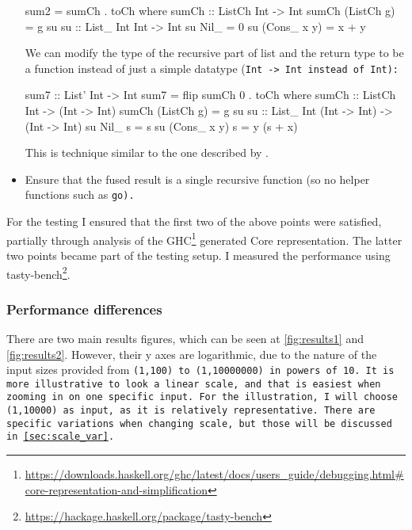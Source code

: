 \begin{itemize}[noitemsep]
\begin{spec}
sum2 = sumCh . toCh
  where sumCh :: ListCh Int -> Int
        sumCh (ListCh g) = g su
        su :: List_ Int Int -> Int
        su Nil_ = 0
        su (Cons_ x y) = x + y
\end{spec}
We can modify the type of the recursive part of list and the return type to be a function instead of just a simple datatype (\tt{Int -> Int} instead of \tt{Int}):
\begin{spec}
sum7 :: List' Int -> Int
sum7 = flip sumCh 0 . toCh
  where sumCh :: ListCh Int -> (Int -> Int)
        sumCh (ListCh g) = g su
        su :: List_ Int (Int -> Int) -> (Int -> Int)
        su Nil_ s = s
        su (Cons_ x y) s = y (s + x)
    \end{spec}

This is technique similar to the one described by \cite{Breitner2018}.
\item Ensure that the fused result is a single recursive function (so no helper functions such as \tt{go}).

\end{itemize}

For the testing I ensured that the first two of the above points were satisfied, partially through analysis of the GHC\footnote{\url{https://downloads.haskell.org/ghc/latest/docs/users_guide/debugging.html\#core-representation-and-simplification}} generated Core representation.
The latter two points became part of the testing setup.
I measured the performance using tasty-bench\footnote{\url{https://hackage.haskell.org/package/tasty-bench}}.

\subsubsection{Performance differences}
There are two main results figures, which can be seen at \autoref{fig:results1} and \autoref{fig:results2}.
However, their y axes are logarithmic, due to the nature of the input sizes provided from \tt{(1,100)} to \tt{(1,10000000)} in powers of 10.
It is more illustrative to look a linear scale, and that is easiest when zooming in on one specific input.
For the illustration, I will choose \tt{(1,10000)} as input, as it is relatively representative.
There are specific variations when changing scale, but those will be discussed in \autoref{sec:scale_var}.

